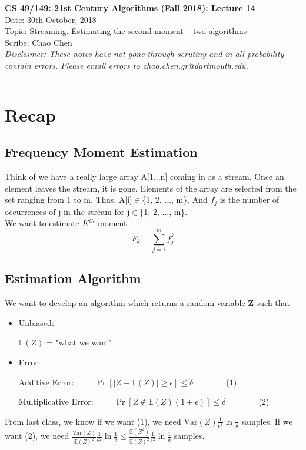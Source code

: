 \documentclass[11pt]{article}
\begin{document}
	\begin{center}
		{\bf \Large CS 49/149: 21st Century Algorithms (Fall 2018): Lecture 14}\\ 
		Date: 30th October, 2018 \\
		Topic: Streaming. Estimating the second moment -- two algorithms \\
		Scribe: Chao Chen \\
		{\em Disclaimer: These notes have not gone through scrutiny and in all probability contain errors. Please email errors to chao.chen.gr@dartmouth.edu.}
	\end{center}
\hrule height 2pt
\vspace{3ex}
\def\loss{\mathsf{loss}}
\section{Recap}
\subsection{Frequency Moment Estimation}
Think of we have a really large array A[1...n] coming in as a stream. Once an element leaves the stream, it is gone. Elements of the array are selected from the set ranging from 1 to m. Thus, A[i]$\in$\{1, 2, ..., m\}. And $f_j$ is the number of occurrences of j in the stream for j$\in$\{1, 2, ..., m\}. \\
We want to estimate $K^{th}$ moment:$$F_k = \sum_{j=1}^{m}f_j^k$$
\subsection{Estimation Algorithm}
We want to develop an algorithm which returns a random variable \textbf{Z} such that
\begin{itemize}
    \item 
    Unbiased:\\
    \centerline{$\mathbb{E}(Z)$ = "what we want"}
    \item 
    Error:\\
    \centerline{Additive Error:\ \ \ \ \  $\Pr[|Z-\mathbb{E}(Z)|\geq\epsilon]\leq \delta$\ \ \ \ \ \ \ \  (1)}
    \centerline{Multiplicative Error:\ \ \ \ \  
    $\Pr[Z\notin \mathbb{E}(Z)(1+\epsilon)]\leq \delta$\ \ \ \ \ \ \ \  (2)} 
\end{itemize}
From last class, we know if we want (1), we need $\mathrm{Var}(Z)\frac{1}{\epsilon^2}\ln{\frac{1}{\delta}}$ samples. If we want (2), we need $\frac{\mathrm{Var}(Z)}{\mathbb{E}(Z)^2}\frac{1}{\epsilon^2}\ln{\frac{1}{\delta}} \leq \frac{\mathbb{E}(Z^2)}{\mathbb{E}(Z)^2}\frac{1}{\epsilon^2}\ln{\frac{1}{\delta}} $ samples.
\end{document}
